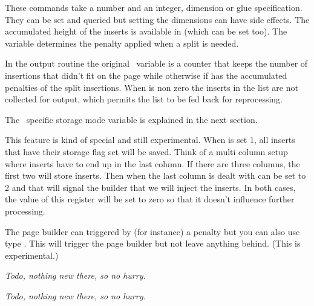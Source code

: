 These commands take a number and an integer, dimension or glue specification.
They can be set and queried but setting the dimensions can have side effects. The
accumulated height of the inserts is available in \type {\insertheights} (which
can be set too). The \type {\floatingpenalty} variable determines the penalty
applied when a split is needed.

In the output routine the original \TEX\ variable \type {\insertpenalties} is a
counter that keeps the number of insertions that didn't fit on the page while
otherwise if has the accumulated penalties of the split insertions. When \type
{\holdinginserts} is non zero the inserts in the list are not collected for
output, which permits the list to be fed back for reprocessing.

The \LUAMETATEX\ specific storage mode \type {\insertstoring} variable is
explained in the next section.

\stopsectionlevel

\startsectionlevel[title=Storing]

This feature is kind of special and still experimental. When \type
{\insertstoring} is set 1, all inserts that have their storage flag set will be
saved. Think of a multi column setup where inserts have to end up in the last
column. If there are three columns, the first two will store inserts. Then when
the last column is dealt with \type {\insertstoring} can be set to 2 and that
will signal the builder that we will inject the inserts. In both cases, the value
of this register will be set to zero so that it doesn't influence further
processing.

\stopsectionlevel

\startsectionlevel[title=Synchronizing]

The page builder can triggered by (for instance) a penalty but you can also use
type {\pageboundary}. This will trigger the page builder but not leave anything
behind. (This is experimental.)

\stopsectionlevel

\startsectionlevel[title=Migration]

{\em Todo, nothing new there, so no hurry.}

\stopsectionlevel

\startsectionlevel[title=Callbacks]

{\em Todo, nothing new there, so no hurry.}

\stopsectionlevel

\stopdocument
